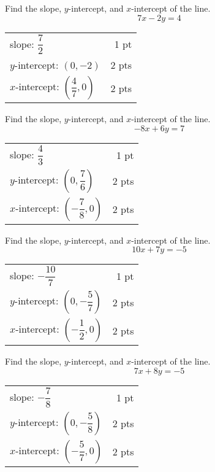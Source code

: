 {
      Find the slope, $y$-intercept, and $x$-intercept of the line. $$7x-2y=4$$
}
{
	\begin{tabular}{l r}
	slope: $\dfrac{7}{2}$ & 1 pt \\
	$y$-intercept: $(0,-2)$ & 2 pts\\
	$x$-intercept: $\left(\dfrac{4}{7},0\right)$ & 2 pts\\
	\end{tabular}
}

{
      Find the slope, $y$-intercept, and $x$-intercept of the line. $$-8x+6y=7$$
}
{
	\begin{tabular}{l r}
	slope: $\dfrac{4}{3}$ & 1 pt \\
	$y$-intercept: $\left(0,\dfrac{7}{6}\right)$ & 2 pts\\
	$x$-intercept: $\left(-\dfrac{7}{8},0\right)$ & 2 pts\\
	\end{tabular}
}

{
      Find the slope, $y$-intercept, and $x$-intercept of the line. $$10x+7y=-5$$
}
{
	\begin{tabular}{l r}
	slope: $-\dfrac{10}{7}$ & 1 pt \\
	$y$-intercept: $\left(0,-\dfrac{5}{7}\right)$ & 2 pts\\
	$x$-intercept: $\left(-\dfrac{1}{2},0\right)$ & 2 pts\\
	\end{tabular}
}

{
      Find the slope, $y$-intercept, and $x$-intercept of the line. $$7x+8y=-5$$
}
{
	\begin{tabular}{l r}
	slope: $-\dfrac{7}{8}$ & 1 pt \\
	$y$-intercept: $\left(0,-\dfrac{5}{8}\right)$ & 2 pts\\
	$x$-intercept: $\left(-\dfrac{5}{7},0\right)$ & 2 pts\\
	\end{tabular}
}
